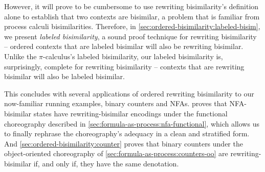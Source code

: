 However, it will prove to be cumbersome to use rewriting bisimilarity's definition alone to establish that two contexts are bisimilar, a problem that is familiar from process calculi bisimilarities.
Therefore, in \cref{sec:ordered-bisimilarity:labeled-bisim}, we present \emph{labeled bisimilarity}, a sound proof technique for rewriting bisimilarity -- ordered contexts that are labeled bisimilar will also be rewriting bisimilar.
Unlike the $\pi$-calculus's labeled bisimilarity, our labeled bisimilarity is, surprisingly, complete for rewriting bisimilarity -- contexts that are rewriting bisimilar will also be labeled bisimilar.

This  concludes with several applications of ordered rewriting bisimilarity to our now-familiar running examples, binary counters and \aclp*{NFA}.
 proves that \ac{NFA}-bisimilar states have rewriting-bisimilar encodings under the functional choreography described in \cref{sec:formula-as-process:nfa-functional}, which allows us to finally rephrase the choreography's adequacy in a clean and stratified form.
And \cref{sec:ordered-bisimilarity:counter} proves that binary counters under the object-oriented choreography of \cref{sec:formula-as-process:counters-oo} are rewriting-bisimilar if, and only if, they have the same denotation.






